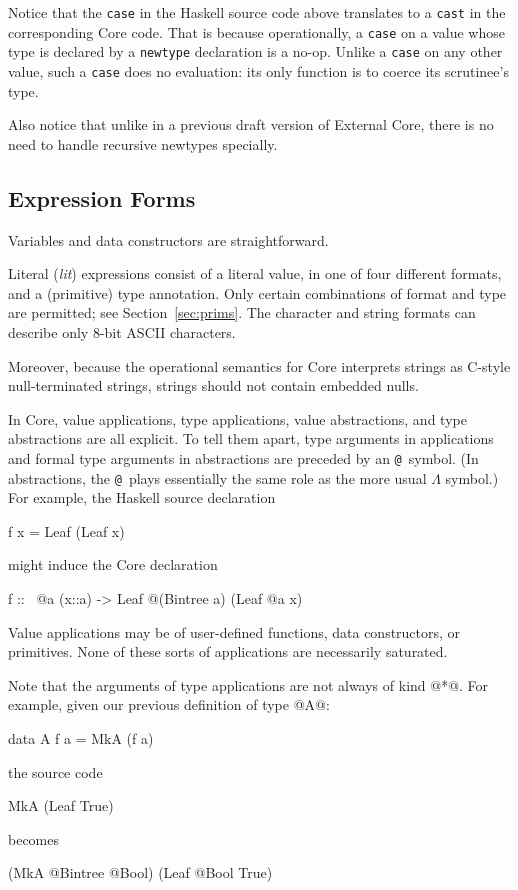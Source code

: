 \documentclass[10pt]{article}
\makeatletter
\newcommand{\at}{\texttt{@}}
\makeatother
\begin{document}
Notice that the {\tt case} in the Haskell source code above translates to a {\tt cast} in the corresponding Core code. That is because operationally, a {\tt case} on a value whose type is declared by a {\tt newtype} declaration is a no-op. Unlike a {\tt case} on any other value, such a {\tt case} does no evaluation: its only function is to coerce its scrutinee's type.

Also notice that unlike in a previous draft version of External Core, there is no need to handle recursive newtypes specially.
\subsection{Expression Forms}
\label{sec:exprs}

Variables and data constructors are straightforward.

Literal ({\it lit}) expressions consist of a literal value, in one of four different formats,
and a (primitive) type annotation.   Only certain combinations of format and type
are permitted; see Section~\ref{sec:prims}.  The character and string formats can describe only
8-bit ASCII characters.  

Moreover, because the operational semantics for Core interprets strings as C-style null-terminated
strings, strings should not contain embedded nulls.

In Core, value applications, type applications, value abstractions, and type abstractions are all explicit. To tell them apart, type arguments in applications
and formal type arguments in abstractions are preceded by an \at\ symbol. (In abstractions,
the \at\ plays essentially the same role as the more usual $\Lambda$ symbol.)
For example, the Haskell source declaration
\begin{code}
f x = Leaf (Leaf x)
\end{code}
might induce the Core declaration
\begin{code}
f :: %
  \ @a (x::a) -> Leaf @(Bintree a) (Leaf @a x)
\end{code}

Value applications may be of user-defined functions, data constructors, or primitives.
None of these sorts of applications are necessarily saturated.

Note that the arguments of type applications are not always of kind @*@.  For example,
given our previous definition of type @A@:
\begin{code}
data A f a = MkA (f a)
\end{code}
the source code
\begin{code}
MkA (Leaf True)
\end{code}
becomes
\begin{code}
(MkA @Bintree @Bool) (Leaf @Bool True)
\end{code}
\end{document}
